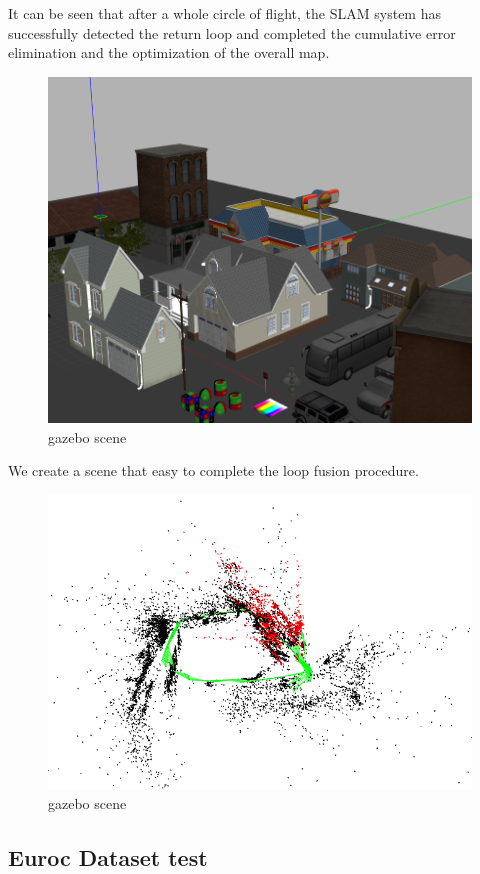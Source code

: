 \documentclass[conference]{IEEEtran}
\begin{document}
It can be seen that after a whole circle of flight, 
the SLAM system has successfully detected the return loop and completed the cumulative error elimination 
and the optimization of the overall map.

\begin{figure}[htbp]
    \centerline{\includegraphics[width=0.9\columnwidth]{stereo1.png}}
    \caption{gazebo scene}
\end{figure}

We create a scene that easy to complete the loop fusion procedure.

\begin{figure}[htbp]
    \centerline{\includegraphics[width=0.9\columnwidth]{stereo3.png}}
    \caption{gazebo scene}
\end{figure}

\subsection{Euroc Dataset test}
\end{document}
